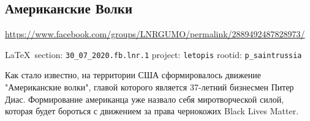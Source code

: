  
 
\subsection{Американские Волки}
\label{sec:30_07_2020.fb.lnr.1}
\url{https://www.facebook.com/groups/LNRGUMO/permalink/2889492487828973/}
  
\vspace{0.5cm}
{\small\LaTeX~section: \verb|30_07_2020.fb.lnr.1| project: \verb|letopis| rootid: \verb|p_saintrussia|}
\vspace{0.5cm}
  
Как стало известно, на территории США сформировалось движение "Американские
волки", главой которого является 37-летний бизнесмен Питер Диас. Формирование
американца уже назвало себя миротворческой силой, которая будет бороться с
движением за права чернокожих Black Lives Matter.
